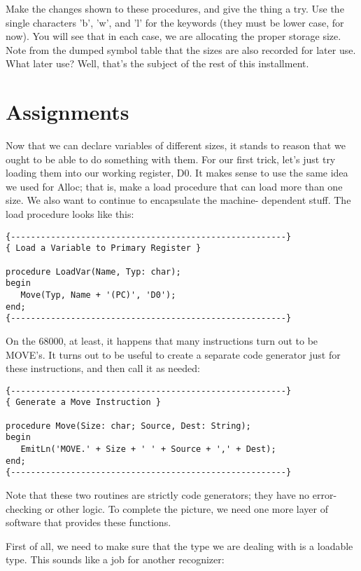 Make the changes shown to these procedures, and give the  thing a try. Use  the  single  characters  'b', 'w', and 'l' for the keywords (they must be lower case, for  now). You will see that in each case, we are allocating the proper storage  size. Note from the dumped symbol table that the sizes are also recorded for later use. What later use?  Well, that's the subject of the rest of this installment.

\section{Assignments}

Now that we can declare variables of different  sizes, it stands to reason that we ought to be able  to  do  something  with them. For our first trick, let's just try loading them into our working register, D0. It makes sense to use the same  idea  we used for Alloc; that is, make a load procedure that can load more than one size. We  also  want  to continue to encapsulate the  machine- dependent stuff. The load procedure looks like this:

\begin{verbatim}
{-------------------------------------------------------}
{ Load a Variable to Primary Register }

procedure LoadVar(Name, Typ: char);
begin
   Move(Typ, Name + '(PC)', 'D0');
end;
{-------------------------------------------------------}
\end{verbatim}

On  the  68000, at least, it happens that many instructions turn out to be MOVE's. It turns out to be useful to create a separate code generator just for these instructions, and then  call  it as needed:

\begin{verbatim}
{-------------------------------------------------------}
{ Generate a Move Instruction }

procedure Move(Size: char; Source, Dest: String);
begin
   EmitLn('MOVE.' + Size + ' ' + Source + ',' + Dest);
end;
{-------------------------------------------------------}
\end{verbatim}

Note that these  two  routines are strictly code generators; they have no error-checking or other  logic. To complete the picture, we need one more layer of software that provides these functions.

First of all, we need to make sure that the  type  we are dealing with is a  loadable  type. This  sounds like a job for another recognizer:

